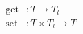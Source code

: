 \begin{align}
  \text{get} & : T \rightarrow T_l \\
  \text{set} & : T \times T_l \rightarrow T
\end{align}